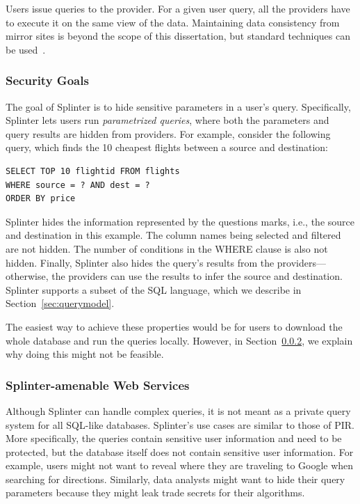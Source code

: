 Users issue queries to the provider.
For a given user query, all the providers have to execute it on the same
view of the data. Maintaining data consistency
from mirror sites is beyond the scope of this dissertation, but
standard techniques can be used~\cite{tewari2002wcdp,chi2008novel}.

\subsubsection{Security Goals}
\label{sec:query_model}
The goal of Splinter is to hide sensitive parameters in
a user's query.
Specifically, Splinter lets users run \emph{parametrized queries}, 
where both the parameters and query results are hidden from providers.
For example, consider the following query, which finds the 10 cheapest flights between a source and destination:
\begin{verbatim}
SELECT TOP 10 flightid FROM flights
WHERE source = ? AND dest = ? 
ORDER BY price
\end{verbatim}
Splinter hides the information represented by the questions marks, i.e.,
the source and destination in this example.
The column names being selected and filtered are not hidden. The number 
of conditions in the WHERE clause is also not hidden.
Finally, Splinter also hides the query's results from the providers---otherwise,
the providers can use the results to infer the source and destination. 
Splinter supports a subset of the SQL language, which we describe in Section~\ref{sec:querymodel}.

The easiest way to achieve these properties would be for users to download the whole database
and run the queries locally. However, in Section~\ref{sec:splinter_cases}, we explain why
doing this might not be feasible. 

\subsubsection{Splinter-amenable Web Services}
\label{sec:splinter_cases}
Although Splinter can handle complex queries, it is not
meant as a private query system for all SQL-like databases.
Splinter's use cases are similar to those of PIR. More specifically,
the queries contain sensitive user information and need to be 
protected, but the database itself does not contain
sensitive user information. For example, users might not
want to reveal where they are traveling to Google when searching
for directions. Similarly, data analysts might want to hide
their query parameters because they might leak trade
secrets for their algorithms.

